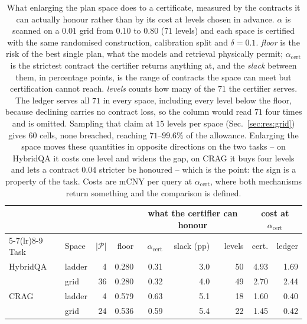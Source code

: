 \begin{table}[t]
\centering
\caption{What enlarging the plan space does to a certificate, measured by the contracts it can actually honour rather than by its cost at levels chosen in advance. $\alpha$ is scanned on a $0.01$ grid from $0.10$ to $0.80$ ($71$ levels) and each space is certified with the same randomised construction, calibration split and $\delta=0.1$. \emph{floor} is the risk of the best single plan, what the models and retrieval physically permit; $\alpha_{\mathrm{cert}}$ is the strictest contract the certifier returns anything at, and the \emph{slack} between them, in percentage points, is the range of contracts the space can meet but certification cannot reach. \emph{levels} counts how many of the $71$ the certifier serves. The ledger serves all $71$ in every space, including every level below the floor, because declining carries no contract loss, so the column would read $71$ four times and is omitted. Sampling that claim at $15$ levels per space (Sec.~\ref{sec:res:grid}) gives $60$ cells, none breached, reaching $71$--$99.6\%$ of the allowance. Enlarging the space moves these quantities in opposite directions on the two tasks -- on HybridQA it costs one level and widens the gap, on CRAG it buys four levels and lets a contract $0.04$ stricter be honoured -- which is the point: the sign is a property of the task. Costs are mCNY per query at $\alpha_{\mathrm{cert}}$, where both mechanisms return something and the comparison is defined.}
\label{tab:grid}
\footnotesize
\begin{tabular}{llrrrrrrr}
\toprule
 & & & & \multicolumn{3}{c}{what the certifier can honour} & \multicolumn{2}{c}{cost at $\alpha_{\mathrm{cert}}$} \\
\cmidrule(lr){5-7}\cmidrule(lr){8-9}
Task & Space & $|\mathcal{P}|$ & floor & $\alpha_{\mathrm{cert}}$ & slack (pp) & levels & cert. & ledger \\
\midrule
HybridQA & ladder & 4 & 0.280 & 0.31 & 3.0 & 50 & 4.93 & 1.69 \\
 & grid & 36 & 0.280 & 0.32 & 4.0 & 49 & 2.70 & 2.44 \\
\addlinespace[2pt]
CRAG & ladder & 4 & 0.579 & 0.63 & 5.1 & 18 & 1.60 & 0.40 \\
 & grid & 24 & 0.536 & 0.59 & 5.4 & 22 & 1.45 & 0.42 \\
\bottomrule
\end{tabular}
\end{table}
